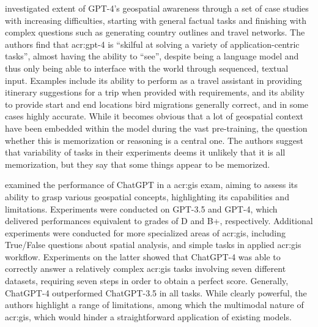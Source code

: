 \cite{robertsGPT4GEOHowLanguage2023} investigated extent of GPT-4's geospatial awareness through a set of case studies with increasing difficulties, starting with general factual tasks and finishing with complex questions such as generating country outlines and travel networks. The authors find that \acrshort{acr:gpt}-4 is \enquote{skilful at solving a variety of application-centric tasks}, almost having the ability to \enquote{see}, despite being a language model and thus only being able to interface with the world through sequenced, textual input. Examples include its ability to perform as a travel assistant in providing itinerary suggestions for a trip when provided with requirements, and its ability to provide start and end locations bird migrations generally correct, and in some cases highly accurate. While it becomes obvious that a lot of geospatial context have been embedded within the model during the vast pre-training, the question whether this is memorization or reasoning is a central one. The authors suggest that variability of tasks in their experiments deems it unlikely that it is all memorization, but they say that some things appear to be memorized.

\cite{mooneyUnderstandingGeospatialSkills2023} examined the performance of ChatGPT in a \acrfull{acr:gis} exam, aiming to assess its ability to grasp various geospatial concepts, highlighting its capabilities and limitations. Experiments were conducted on GPT-3.5 and GPT-4, which delivered performances equivalent to grades of D and B+, respectively. Additional experiments were conducted for more specialized areas of \acrshort{acr:gis}, including True/False questions about spatial analysis, and simple tasks in applied \acrshort{acr:gis} workflow. Experiments on the latter showed that ChatGPT-4 was able to correctly answer a relatively complex \acrshort{acr:gis} tasks involving seven different datasets, requiring seven steps in order to obtain a perfect score. Generally, ChatGPT-4 outperformed ChatGPT-3.5 in all tasks. While clearly powerful, the authors highlight a range of limitations, among which the multimodal nature of \acrshort{acr:gis}, which would hinder a straightforward application of existing models.

